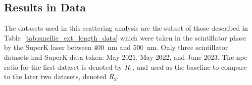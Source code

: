 
\subsection{Results in Data}
The datasets used in this scattering analysis are the subset of those described in Table~\ref{tab:smellie_ext_length_data} which were taken in the scintillator phase by the SuperK laser between \SI{400}{\nm} and \SI{500}{\nm}. Only three scintillator datasets had SuperK data taken: May 2021, May 2022, and June 2023. The npe ratio for the first dataset is denoted by $R_{1}$, and used as the baseline to compare to the later two datasets, denoted $R_{2}$.

